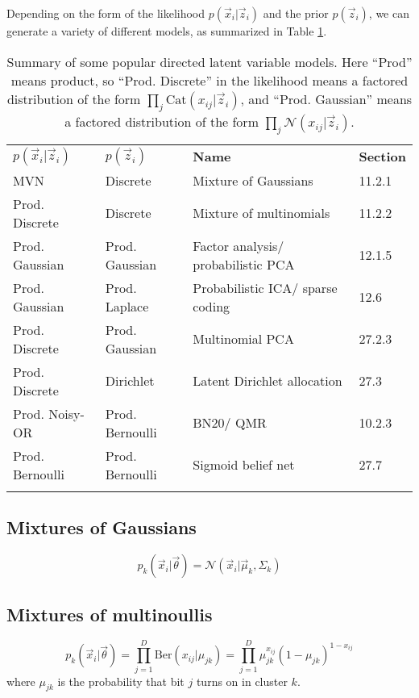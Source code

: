 Depending on the form of the likelihood $p(\vec{x}_i|\vec{z}_i)$ and the prior $p(\vec{z}_i)$, we can generate a variety of different models, as summarized in Table \ref{tab:popular-directed-latent-variable-models}.

\begin{longtable}{llll}
\hline\noalign{\smallskip}
$p(\vec{x}_i|\vec{z}_i)$ & $p(\vec{z}_i)$ & \textbf{Name} & \textbf{Section} \\
\noalign{\smallskip}\hline\noalign{\smallskip}
MVN & Discrete & Mixture of Gaussians & 11.2.1 \\
Prod. Discrete & Discrete & Mixture of multinomials & 11.2.2 \\
Prod. Gaussian & Prod. Gaussian & Factor analysis/ probabilistic PCA & 12.1.5 \\
Prod. Gaussian & Prod. Laplace & Probabilistic ICA/ sparse coding & 12.6 \\
Prod. Discrete & Prod. Gaussian & Multinomial PCA & 27.2.3 \\
Prod. Discrete & Dirichlet & Latent Dirichlet allocation & 27.3 \\
Prod. Noisy-OR & Prod. Bernoulli & BN20/ QMR & 10.2.3 \\
Prod. Bernoulli & Prod. Bernoulli & Sigmoid belief net & 27.7 \\
\noalign{\smallskip}\hline\noalign{\smallskip}
\caption{Summary of some popular directed latent variable models. Here “Prod” means product, so “Prod. Discrete” in the likelihood means a factored distribution of the form $\prod_j \mathrm{Cat}(x_{ij}|\vec{z}_i)$, and “Prod. Gaussian” means a factored distribution of the form $\prod_j \mathcal{N}(x_{ij}|\vec{z}_i)$.}\label{tab:popular-directed-latent-variable-models} \\
\end{longtable}


\subsection{Mixtures of Gaussians}
\begin{equation}
p_k(\vec{x}_i|\vec{\theta})=\mathcal{N}(\vec{x}_i|\vec{\mu}_k,\Sigma_k)
\end{equation}


\subsection{Mixtures of multinoullis}
\begin{equation}
p_k(\vec{x}_i|\vec{\theta})=\prod\limits_{j=1}^D \mathrm{Ber}(x_{ij}|\mu_{jk})=\prod\limits_{j=1}^D \mu_{jk}^{x_{ij}}(1-\mu_{jk})^{1-x_{ij}}
\end{equation}
where $\mu_{jk}$ is the probability that bit $j$ turns on in cluster $k$.

